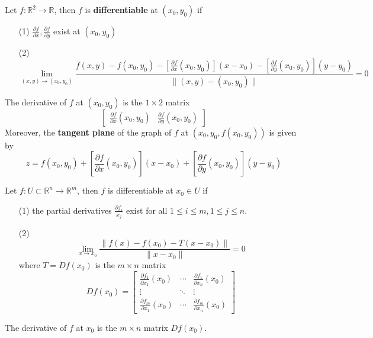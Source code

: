 \documentclass[openany]{book}
\newcommand{\R}{\mathbb{R}}
\begin{document}
\begin{defn}
    Let $f:\R^2\to\R$, then $f$ is \textbf{differentiable} at $(x_0,y_0)$ if 
    \begin{enumerate}
        \item[(1)] $\frac{\partial f}{\partial x},\frac{\partial f}{\partial y}$ exist at $(x_0,y_0)$
        \item[(2)] 
        \begin{equation*}
            \lim_{(x,y)\to(x_0,y_0)}\frac{f(x,y)-f(x_0,y_0)-\left[\frac{\partial f}{\partial x}(x_0,y_0)\right](x-x_0)-\left[\frac{\partial f}{\partial y}(x_0,y_0)\right](y-y_0)}{\|(x,y)-(x_0,y_0)\|}=0
        \end{equation*}
    \end{enumerate}
    The derivative of $f$ at $(x_0,y_0)$ is the $1\times 2$ matrix 
    \begin{equation*}
        \begin{bmatrix}\frac{\partial f}{\partial x}(x_0,y_0)&\frac{\partial f}{\partial y}(x_0,y_0)\end{bmatrix}
    \end{equation*}
    Moreover, the \textbf{tangent plane} of the graph of $f$ at $(x_0,y_0, f(x_0,y_0))$ is given by 
    \begin{equation*}
        z=f(x_0,y_0)+\left[\frac{\partial f}{\partial x}(x_0,y_0)\right](x-x_0)+\left[\frac{\partial f}{\partial y}(x_0,y_0)\right](y-y_0)
    \end{equation*}
\end{defn}

\begin{defn}
    Let $f:U\subset\R^n\to\R^m$, then $f$ is differentiable at $x_0\in U$ if
    \begin{enumerate}
        \item[(1)] the partial derivatives $\frac{\partial f_i}{x_j}$ exist for all $1\leq i\leq m, 1\leq j\leq n$. 
        \item[(2)]
        \begin{equation*}
            \lim_{x\to x_0}\frac{\|f(x)-f(x_0)-T(x-x_0)\|}{\|x-x_0\|}=0
        \end{equation*}
        where $T=Df(x_0)$ is the $m\times n$ matrix 
        \begin{equation*}
            Df(x_0)=
            \begin{bmatrix}
            \frac{\partial f_1}{\partial x_1}(x_0) & \cdots & \frac{\partial f_1}{\partial x_n}(x_0) \\
            \vdots & \ddots & \vdots \\
            \frac{\partial f_m}{\partial x_1}(x_0) & \cdots & \frac{\partial f_m}{\partial x_n}(x_0)
            \end{bmatrix}
        \end{equation*}
    \end{enumerate}
    The derivative of $f$ at $x_0$ is the $m\times n$ matrix $Df(x_0)$.
\end{defn}
\end{document}
